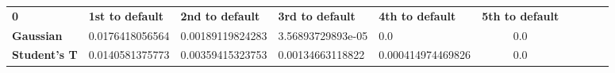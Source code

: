 \begin{tabular}{|l|l|l|l|l|c|c|c|c|c|}
\hline
\textbf{0} & \textbf{1st to default} & \textbf{2nd to default} & \textbf{3rd to default} & \textbf{4th to default} & \textbf{5th to default}\\\hhline{|=|=|=|=|=|=|}
\textbf{Gaussian} & 0.0176418056564 & 0.00189119824283 & 3.56893729893e-05 & 0.0 & 0.0\\
\textbf{Student's T} & 0.0140581375773 & 0.00359415323753 & 0.00134663118822 & 0.000414974469826 & 0.0\\
\hline
\end{tabular}
